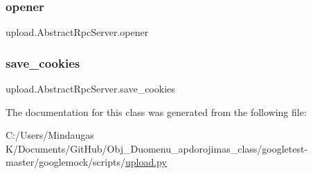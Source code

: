\mbox{\label{classupload_1_1_abstract_rpc_server_aa931446476e0e86f3ade7fef0a0aea5a}} 
\subsubsection{\texorpdfstring{opener}{opener}}
{\footnotesize\ttfamily upload.\+Abstract\+Rpc\+Server.\+opener}

\mbox{\label{classupload_1_1_abstract_rpc_server_affe342205c4647d41b127f5a5634858b}} 
\subsubsection{\texorpdfstring{save\_cookies}{save\_cookies}}
{\footnotesize\ttfamily upload.\+Abstract\+Rpc\+Server.\+save\+\_\+cookies}



The documentation for this class was generated from the following file\+:\begin{DoxyCompactItemize}
\item 
C\+:/\+Users/\+Mindaugas K/\+Documents/\+Git\+Hub/\+Obj\+\_\+\+Duomenu\+\_\+apdorojimas\+\_\+class/googletest-\/master/googlemock/scripts/\mbox{\hyperlink{googletest-master_2googlemock_2scripts_2upload_8py}{upload.\+py}}\end{DoxyCompactItemize}
